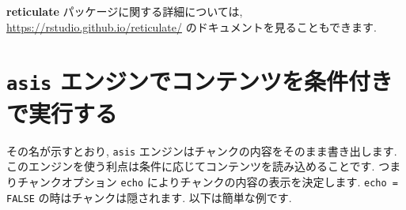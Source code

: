 \documentclass[
  11pt,
  lualatex,ja=standard,jafont=noto]{bxjsreport}
\newenvironment{Shaded}{\begin{snugshade}}{\end{snugshade}}
\newcommand{\InformationTok}[1]{\textcolor[rgb]{0.56,0.35,0.01}{\textbf{\textit{#1}}}}
\newcommand{\NormalTok}[1]{#1}
\begin{document}
\begin{Shaded}
\end{Shaded}

\textbf{reticulate} パッケージに関する詳細については, \url{https://rstudio.github.io/reticulate/} のドキュメントを見ることもできます.

\hypertarget{eng-asis}{%
\section{\texorpdfstring{\texttt{asis} エンジンでコンテンツを条件付きで実行する}{asis エンジンでコンテンツを条件付きで実行する}}\label{eng-asis}}

その名が示すとおり, \texttt{asis} エンジンはチャンクの内容をそのまま書き出します. このエンジンを使う利点は条件に応じてコンテンツを読み込めることです. つまりチャンクオプション \texttt{echo} によりチャンクの内容の表示を決定します. \texttt{echo = FALSE} の時はチャンクは隠されます. 以下は簡単な例です.
\end{document}
